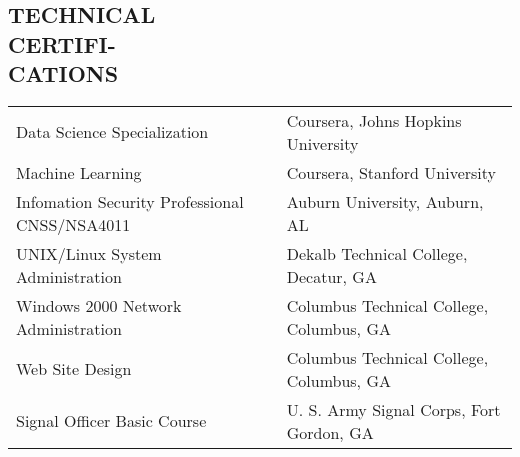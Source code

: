 \documentclass[margin, 10pt]{res} %
\begin{document}
\begin{resume}
 


\section{TECHNICAL\\CERTIFI-\\CATIONS}

\small
    \begin{tabular}{l l }
    Data Science Specialization & Coursera, Johns Hopkins University\\

        Machine Learning & Coursera, Stanford University\\

    Infomation Security Professional CNSS/NSA4011 & Auburn University, Auburn, AL\\

        UNIX/Linux System Administration & Dekalb Technical College,  Decatur, GA\\

        Windows 2000 Network Administration & Columbus Technical College, Columbus, GA\\

        Web Site Design & Columbus Technical College, Columbus, GA\\

        Signal Officer Basic Course & U. S. Army Signal Corps,  Fort Gordon, GA\\
    \end{tabular}
    \normalsize
%
%
%
%
%
%



\end{resume}
\end{document}
